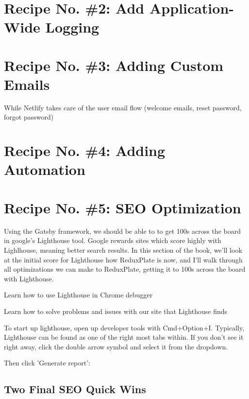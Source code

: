 \documentclass[paper=6in:9in,pagesize=pdftex,headinclude=on,footinclude=on,12pt]{scrbook}
\begin{document}
\chapter{Recipe No. \#2: Add Application-Wide Logging}

\chapter{Recipe No. \#3: Adding Custom Emails}

While Netlify takes care of the user email flow (welcome emails, reset password, forgot password)

\chapter{Recipe No. \#4: Adding Automation}

\chapter{Recipe No. \#5: SEO Optimization}


Using the Gatsby framework, we should be able to to get 100s across the board in google's Lighthouse tool. Google rewards sites which score highly with Lighlhouse, meaning better search results. In this section of the book, we'll look at the initial score for Lighthouse how ReduxPlate is now, and I'll walk through all optimizations we can make to ReduxPlate, getting it to 100s across the board with Lighthouse.

\begin{arrows}
\item Learn how to use Lighthouse in Chrome debugger
\item Learn how to solve problems and issues with our site that Lighthouse finds
\end{arrows}

To start up lighthouse, open up developer tools with Cmd+Option+I. Typically, Lighthouse can be found as one of the right most tabs within. If you don't see it right away, click the double arrow symbol and select it from the dropdown.

Then click 'Generate report':


\section{Two Final SEO Quick Wins}
\end{document}
